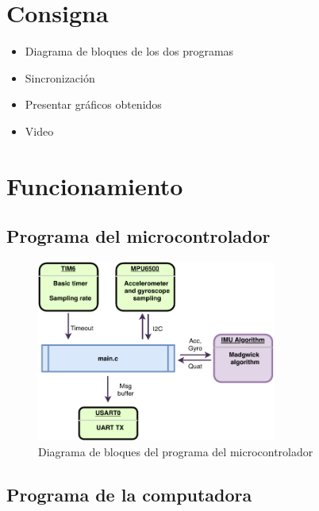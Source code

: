 \documentclass{article}
\begin{document}


\tableofcontents

\section{Consigna}
\begin{itemize}
	\item Diagrama de bloques de los dos programas
	\item Sincronizaci\'on
	\item Presentar gr\'aficos obtenidos
	\item Video
\end{itemize}

\section{Funcionamiento}

\subsection{Programa del microcontrolador}

\begin{figure}[ht]
	\centering
	\includegraphics[width=0.7\textwidth]{imgs/cprog.pdf}
	\caption{Diagrama de bloques del programa del microcontrolador}
	\label{fig:cprog}
\end{figure}

\subsection{Programa de la computadora}
\end{document}
